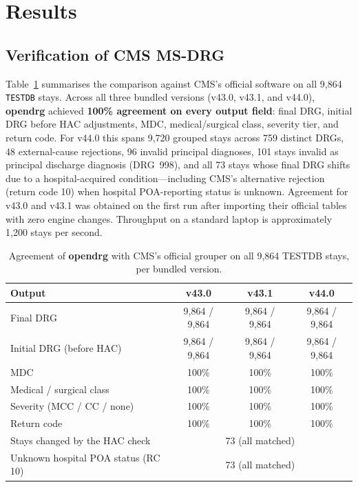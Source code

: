 \documentclass[fleqn,10pt]{IOMEDArticle}
\begin{document}

\section{Results}
\label{sec:results}

\subsection{Verification of CMS MS-DRG}

Table~\ref{tab:results} summarises the comparison against CMS's official software on all 9{,}864 \texttt{TESTDB} stays. Across all three bundled versions (v43.0, v43.1, and v44.0), \textbf{opendrg} achieved \textbf{100\% agreement on every output field}: final DRG, initial DRG before HAC adjustments, MDC, medical/surgical class, severity tier, and return code. For v44.0 this spans 9{,}720 grouped stays across 759 distinct DRGs, 48 external-cause rejections, 96 invalid principal diagnoses, 101 stays invalid as principal discharge diagnosis (DRG~998), and all 73 stays whose final DRG shifts due to a hospital-acquired condition---including CMS's alternative rejection (return code 10) when hospital POA-reporting status is unknown. Agreement for v43.0 and v43.1 was obtained on the first run after importing their official tables with zero engine changes. Throughput on a standard laptop is approximately 1{,}200 stays per second.

\begin{table}[!t]\centering
\caption{Agreement of \textbf{opendrg} with CMS's official grouper on all 9{,}864 TESTDB stays, per bundled version.}
\label{tab:results}
\scriptsize
\setlength{\tabcolsep}{3.0pt}
\begin{tabular}{@{}lccc@{}}
\toprule
Output & v43.0 & v43.1 & v44.0 \\
\midrule
Final DRG & 9{,}864 / 9{,}864 & 9{,}864 / 9{,}864 & 9{,}864 / 9{,}864 \\
Initial DRG (before HAC) & 9{,}864 / 9{,}864 & 9{,}864 / 9{,}864 & 9{,}864 / 9{,}864 \\
MDC & 100\% & 100\% & 100\% \\
Medical / surgical class & 100\% & 100\% & 100\% \\
Severity (MCC / CC / none) & 100\% & 100\% & 100\% \\
Return code & 100\% & 100\% & 100\% \\
\midrule
Stays changed by the HAC check & \multicolumn{3}{c}{73 (all matched)} \\
Unknown hospital POA status (RC 10) & \multicolumn{3}{c}{73 (all matched)} \\
\bottomrule
\end{tabular}
\end{table}
\end{document}
